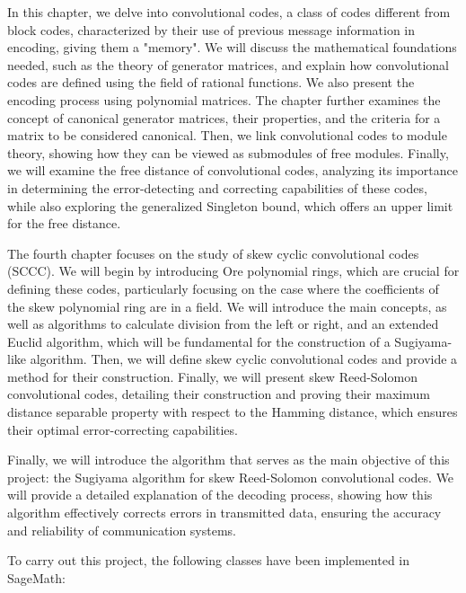 In this chapter, we delve into convolutional codes, a class of codes different from block codes, characterized by their use of previous message information in encoding, giving them a "memory". We will discuss the mathematical foundations needed, such as the theory of generator matrices, and explain how convolutional codes are defined using the field of rational functions. We also present the encoding process using polynomial matrices. The chapter further examines the concept of canonical generator matrices, their properties, and the criteria for a matrix to be considered canonical. Then, we link convolutional codes to module theory, showing how they can be viewed as submodules of free modules. Finally, we will examine the free distance of convolutional codes, analyzing its importance in determining the error-detecting and correcting capabilities of these codes, while also exploring the generalized Singleton bound, which offers an upper limit for the free distance.


The fourth chapter focuses on the study of skew cyclic convolutional codes (SCCC). We will begin by introducing Ore polynomial rings, which are crucial for defining these codes, particularly focusing on the case where the coefficients of the skew polynomial ring are in a field. We will introduce the main concepts, as well as algorithms to calculate division from the left or right, and an extended Euclid algorithm, which will be fundamental for the construction of a Sugiyama-like algorithm. Then, we will define skew cyclic convolutional codes and provide a method for their construction. Finally, we will present skew Reed-Solomon convolutional codes, detailing their construction and proving their maximum distance separable property with respect to the Hamming distance, which ensures their optimal error-correcting capabilities.


Finally, we will introduce the algorithm that serves as the main objective of this project: the Sugiyama algorithm for skew Reed-Solomon convolutional codes. We will provide a detailed explanation of the decoding process, showing how this algorithm effectively corrects errors in transmitted data, ensuring the accuracy and reliability of communication systems.

To carry out this project, the following classes have been implemented in SageMath:

